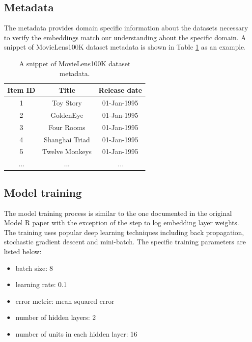\documentclass[conference]{IEEEtran}
\begin{document}
\subsection{Metadata}
The metadata provides domain specific information about the datasets necessary to verify the embeddings match our understanding about the specific domain. A snippet of MovieLens100K dataset metadata is shown in Table \ref{tab:movielens100kmeta} as an example.
\begin{table}[!ht]
	\centering
	\caption{A snippet of MovieLens100K dataset metadata.}
	\begin{tabular}{ccc} \hline \rowcolor{blue!30}
		Item ID & Title & Release date \\ \hline
		1 & Toy Story & 01-Jan-1995 \\ \hline
		2 & GoldenEye & 01-Jan-1995 \\ \hline
		3 & Four Rooms & 01-Jan-1995 \\ \hline
		4 & Shanghai Triad & 01-Jan-1995 \\ \hline
		5 & Twelve Monkeys & 01-Jan-1995 \\ \hline
		... & ... & ... \\ \hline
	\end{tabular}
	\label{tab:movielens100kmeta}
\end{table}

\subsection{Model training}
The model training process is similar to the one documented in the original Model R paper with the exception of the step to log embedding layer weights.
The training uses popular deep learning techniques including back propagation, stochastic gradient descent and mini-batch.
The specific training parameters are listed below:
\begin{itemize}
	\item batch size: 8
	\item learning rate: 0.1
	\item error metric: mean squared error
	\item number of hidden layers: 2
	\item number of units in each hidden layer: 16
\end{itemize}
\end{document}
